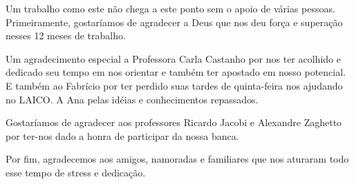 \begin{agradecimentos}
	
	Um trabalho como este não chega a este ponto sem o apoio de várias pessoas. Primeiramente, gostaríamos de agradecer a Deus que nos deu força e superação nesses 12 meses de trabalho.

	Um agradecimento especial a Professora Carla Castanho por nos ter acolhido e dedicado seu tempo em nos orientar e também ter apostado em nosso potencial. E também ao Fabrício por ter perdido suas tardes de quinta-feira nos ajudando no LAICO. A Ana pelas idéias e conhecimentos repassados.

	Gostaríamos de agradecer aos professores Ricardo Jacobi e Alexandre Zaghetto por ter-nos dado a honra de participar da nossa banca.

	Por fim, agradecemos aos amigos, namoradas e familiares que nos aturaram todo esse tempo de stress e dedicação.

\end{agradecimentos}